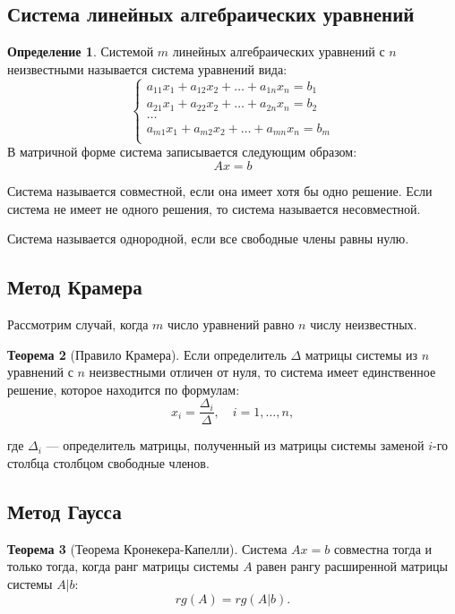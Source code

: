\documentclass[12pt]{report}
\theoremstyle{definition}
\newtheorem{theorem}{Теорема}[chapter]
\newtheorem{definition}[theorem]{Определение}
\begin{document}
\subsection{Система линейных алгебраических уравнений}
\begin{definition}
Системой $m$ линейных алгебраических уравнений с $n$ неизвестными называется
система уравнений вида:
$$
\begin{cases}
    a_{11}x_1 + a_{12}x_2 + \dots + a_{1n}x_n = b_1 \\
    a_{21}x_1 + a_{22}x_2 + \dots + a_{2n}x_n = b_2\\
    \dots\\
    a_{m1}x_1 + a_{m2}x_2 + \dots + a_{mn}x_n = b_m \\
\end{cases}
$$
В матричной форме система записывается следующим образом:
$$
Ax = b
$$
\end{definition}

Система называется совместной, если она имеет хотя бы одно решение.
Если система не имеет не одного решения, то система называется несовместной.

Система называется однородной, если все свободные члены равны нулю.

\subsection{Метод Крамера}
Рассмотрим случай, когда $m$ число уравнений равно $n$ числу неизвестных.

\begin{theorem}[Правило Крамера]
Если определитель $\Delta$ матрицы системы из $n$ уравнений с 
$n$ неизвестными отличен от нуля, то система имеет единственное решение,
которое находится по формулам:
$$
x_i = \dfrac{\Delta_i}{\Delta},\quad i = 1, \dots, n,
$$

где $\Delta_i$ --- определитель матрицы, полученный из матрицы системы заменой
$i$-го столбца столбцом свободные членов.
\end{theorem}

\subsection{Метод Гаусса}

\begin{theorem}[Теорема Кронекера-Капелли]
Система $Ax=b$ совместна тогда и только тогда, когда ранг матрицы
системы $A$ равен рангу расширенной матрицы системы $A|b$:
$$
rg(A) = rg(A|b).
$$
\end{theorem}
\end{document}
